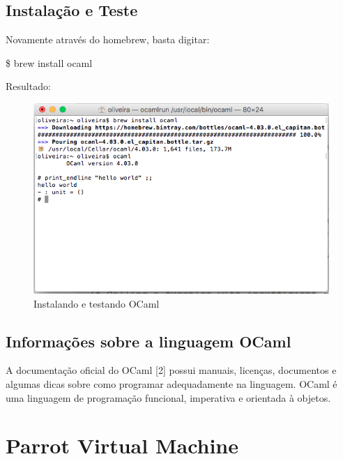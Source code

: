 \documentclass[12pt,a4paper,twoside]{report}
\begin{document}
\subsection{Instalação e Teste}
Novamente através do homebrew, basta digitar:
\begin{terminal}
\$ brew install ocaml
\end{terminal}
Resultado:
\begin{figure}[!ht]
\centering
\caption{Instalando e testando OCaml}
\includegraphics[scale=0.27]{imagens/brew-ocaml.png}
\end{figure}
\subsection{Informações sobre a linguagem OCaml}
A documentação oficial do OCaml [2] possui manuais, licenças, documentos e algumas dicas sobre como programar adequadamente na linguagem.
OCaml é uma linguagem de programação funcional, imperativa e orientada à objetos.

\section{Parrot Virtual Machine}
\end{document}

